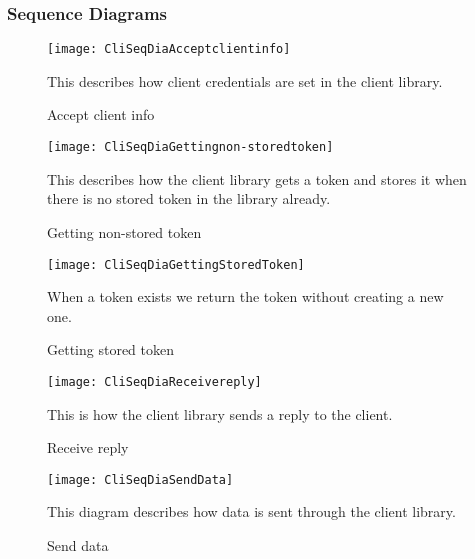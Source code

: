 	\subsubsection{Sequence Diagrams}\label{client sequence diagrams}
		\begin{figure}[H]
			\centering	
			\texttt{[image: CliSeqDiaAcceptclientinfo]}
			\caption{Accept client info}
			This describes how client credentials are set in the client library. 
			\label{fig:CliSeqDiaAcceptclientinfo}
		\end{figure}
		\begin{figure}[H]
			\centering	
			\texttt{[image: CliSeqDiaGettingnon-storedtoken]}
			\caption{Getting non-stored token}
			This describes how the client library gets a token and stores it when there is no stored token in the library already. 
			\label{fig:CliSeqDiaGettingnon-storedtoken}
		\end{figure}
		\begin{figure}[H]
			\centering	
			\texttt{[image: CliSeqDiaGettingStoredToken]}
			\caption{Getting stored token}
			When a token exists we return the token without creating a new one. 
			\label{fig:CliSeqDiaGettingStoredToken}
		\end{figure}
		\begin{figure}[H]
			\centering	
			\texttt{[image: CliSeqDiaReceivereply]}
			\caption{Receive reply}
			This is how the client library sends a reply to the client. 
			\label{fig:CliSeqDiaReceivereply}
		\end{figure}
		\begin{figure}[H]
			\centering	
			\texttt{[image: CliSeqDiaSendData]}
			\caption{Send data}
			This diagram describes how data is sent through the client library. 
			\label{fig:CliSeqDiaSendData}
		\end{figure}

		

